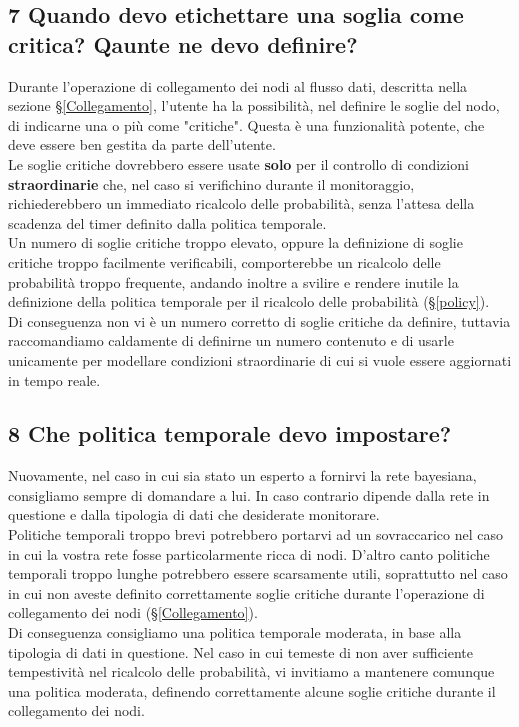 \subsection*{7 Quando devo etichettare una soglia come critica? Qaunte ne devo definire?}
Durante l'operazione di collegamento dei nodi al flusso dati, descritta nella sezione §\ref{Collegamento}, l'utente ha la possibilità, nel definire le soglie del nodo, di indicarne una o più come "critiche". Questa è una funzionalità potente, che deve essere ben gestita da parte dell'utente.\\
Le soglie critiche dovrebbero essere usate \textbf{solo} per il controllo di condizioni \textbf{straordinarie} che, nel caso si verifichino durante il monitoraggio, richiederebbero un immediato ricalcolo delle probabilità, senza l'attesa della scadenza del timer definito dalla politica temporale.\\
Un numero di soglie critiche troppo elevato, oppure la definizione di soglie critiche troppo facilmente verificabili, comporterebbe un ricalcolo delle probabilità troppo frequente, andando inoltre a svilire e rendere inutile la definizione della politica temporale per il ricalcolo delle probabilità (§\ref{policy}).\\
Di conseguenza non vi è un numero corretto di soglie critiche da definire, tuttavia raccomandiamo caldamente di definirne un numero contenuto e di usarle unicamente per modellare condizioni straordinarie di cui si vuole essere aggiornati in tempo reale.

\subsection*{8 Che politica temporale devo impostare?}
Nuovamente, nel caso in cui sia stato un esperto a fornirvi la rete bayesiana, consigliamo sempre di domandare a lui. In caso contrario dipende dalla rete in questione e dalla tipologia di dati che desiderate monitorare.\\
Politiche temporali troppo brevi potrebbero portarvi ad un sovraccarico nel caso in cui la vostra rete fosse particolarmente ricca di nodi. D'altro canto politiche temporali troppo lunghe potrebbero essere scarsamente utili, soprattutto nel caso in cui non aveste definito correttamente soglie critiche durante l'operazione di collegamento dei nodi (§\ref{Collegamento}).\\
Di conseguenza consigliamo una politica temporale moderata, in base alla tipologia di dati in questione. Nel caso in cui temeste di non aver sufficiente tempestività nel ricalcolo delle probabilità, vi invitiamo a mantenere comunque una politica moderata, definendo correttamente alcune soglie critiche durante il collegamento dei nodi.


